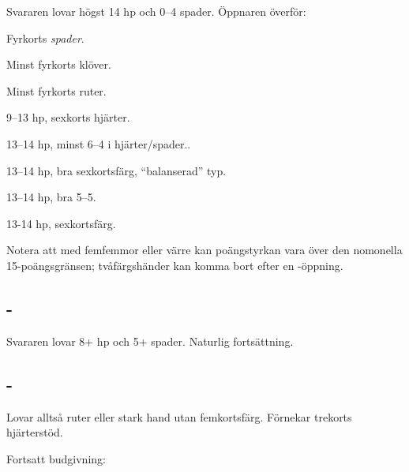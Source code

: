 Svararen lovar högst 14 hp och 0--4 spader. Öppnaren överför:

\begin{beskriv}
   \item[\NT{1}] Fyrkorts \emph{spader}.
   \item[\kl{2}] Minst fyrkorts klöver.
   \item[\ru{2}] Minst fyrkorts ruter.
   \item[\hj{2}] 9--13 hp, sexkorts hjärter.

   \item[\spa{2}] 13--14 hp, minst 6--4 i hjärter/spader..

   \item[\NT{2}] 13--14 hp, bra sexkortsfärg, ``balanserad'' typ.

   \item[\la{3}] 13--14 hp, bra 5--5.

   \item[\hj{3}] 13-14 hp, sexkortsf{\"a}rg.

\end{beskriv}

Notera att med femfemmor eller värre kan poängstyrkan vara över den
nomonella 15-poängsgränsen; tvåfärgshänder kan komma bort efter en
-öppning.

\subsection{ - }

Svararen lovar 8+ hp och 5+ spader. Naturlig fortsättning.

\subsection{ - }

Lovar alltså ruter eller stark hand utan femkortsfärg. Förnekar trekorts
hjärterstöd.

Fortsatt budgivning:

